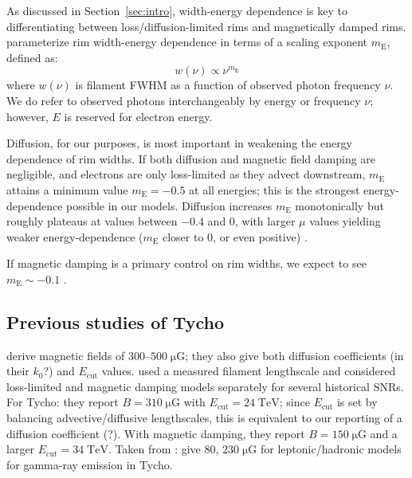 \documentclass[iop, apj, numberedappendix, twocolappendix]{emulateapj}
\newcommand*{\mt}{\mathrm}
\newcommand*{\unit}[1]{\;\mt{#1}}  %
\newcommand*{\mE}{m_\mt{E}}
\newcommand*{\Ecut}{E_{\mt{cut}}}
\begin{document}
As discussed in Section~\ref{sec:intro}, width-energy dependence is key to
differentiating between loss/diffusion-limited rims and magnetically damped
rims.   parameterize rim width-energy dependence in
terms of a scaling exponent $\mE$, defined as:
\begin{equation}
    w(\nu) \propto \nu^{\mE}
\end{equation}
where $w(\nu)$ is filament FWHM as a function of observed photon frequency
$\nu$. We do refer to observed photons interchangeably by energy or
frequency $\nu$; however, $E$ is reserved for electron energy.

Diffusion, for our purposes, is most important in weakening the energy
dependence of rim widths.  If both diffusion and magnetic field damping are
negligible, and electrons are only loss-limited as they advect downstream,
$\mE$ attains a minimum value $\mE = -0.5$ at all energies; this is the
strongest energy-dependence possible in our models.
Diffusion increases $\mE$ monotonically but roughly plateaus at values between
$-0.4$ and $0$, with larger $\mu$ values yielding weaker energy-dependence
($\mE$ closer to $0$, or even positive) .

If magnetic damping is a primary control on rim widths, we expect to see $\mE
\sim -0.1$ .

\subsection{Previous studies of Tycho}

\citet{parizot2006} derive magnetic fields of $300$--$500 \unit{\mu G}$; they
also give both diffusion coefficients (in their $k_0$?) and $\Ecut$ values.
\citet{rettig2012} used a measured filament lengthscale and considered
loss-limited and magnetic damping models separately for several historical
SNRs.  For Tycho: they report $B = 310 \unit{\mu G}$ with $\Ecut = 24
\unit{TeV}$; since $\Ecut$ is set by balancing advective/diffusive
lengthscales, this is equivalent to our reporting of a diffusion coefficient
(?).  With magnetic damping, they report $B = 150 \unit{\mu G}$ and a larger
$\Ecut = 34 \unit{TeV}$.  Taken from \citet{rettig2012}: \citet{acciari2011}
give $80$, $230 \unit{\mu G}$ for leptonic/hadronic models for gamma-ray
emission in Tycho.
\end{document}
